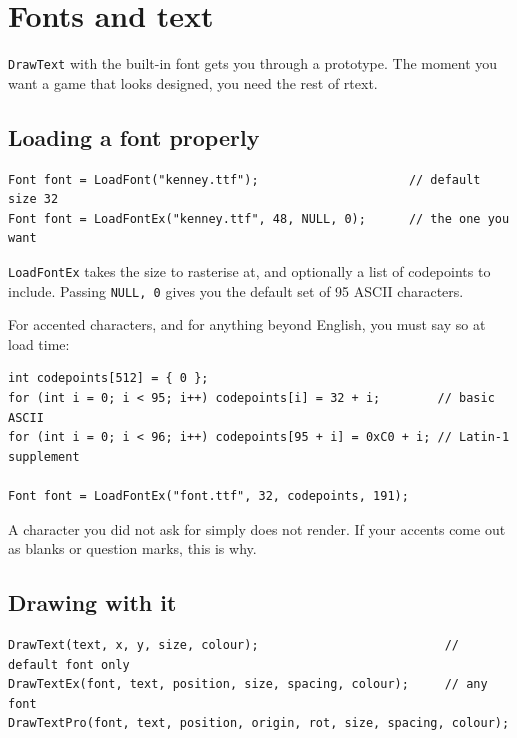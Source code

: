 \chapter{Fonts and text}

\lstinline|DrawText| with the built-in font gets you through a prototype. The
moment you want a game that looks designed, you need the rest of rtext.

\section{Loading a font properly}

\begin{lstlisting}
Font font = LoadFont("kenney.ttf");                     // default size 32
Font font = LoadFontEx("kenney.ttf", 48, NULL, 0);      // the one you want
\end{lstlisting}

\lstinline|LoadFontEx| takes the size to rasterise at, and optionally a list of
codepoints to include. Passing \lstinline|NULL, 0| gives you the default set of
95 ASCII characters.


For accented characters, and for anything beyond English, you must say so at load
time:

\begin{lstlisting}
int codepoints[512] = { 0 };
for (int i = 0; i < 95; i++) codepoints[i] = 32 + i;        // basic ASCII
for (int i = 0; i < 96; i++) codepoints[95 + i] = 0xC0 + i; // Latin-1 supplement

Font font = LoadFontEx("font.ttf", 32, codepoints, 191);
\end{lstlisting}

A character you did not ask for simply does not render. If your accents come out
as blanks or question marks, this is why.

\section{Drawing with it}

\begin{lstlisting}
DrawText(text, x, y, size, colour);                          // default font only
DrawTextEx(font, text, position, size, spacing, colour);     // any font
DrawTextPro(font, text, position, origin, rot, size, spacing, colour);
\end{lstlisting}

